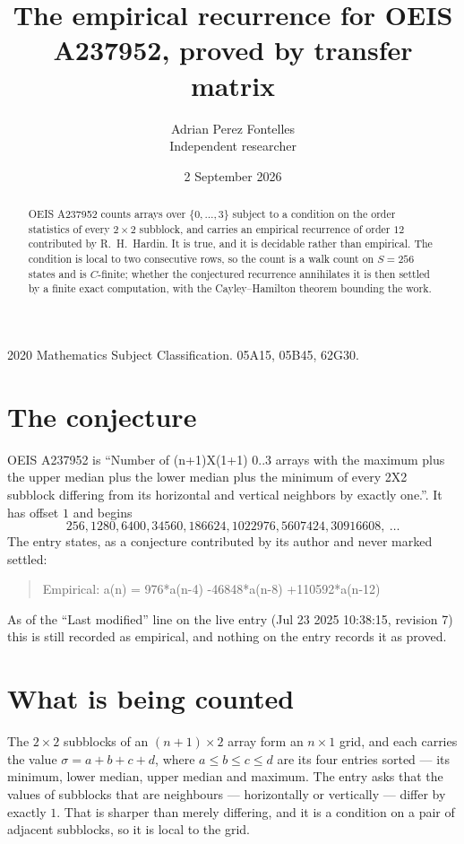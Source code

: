 \documentclass[11pt,a4paper]{article}
\title{The empirical recurrence for OEIS A237952, proved by transfer matrix}
\author{Adrian Perez Fontelles\\ \small Independent researcher}
\date{2 September 2026}
\theoremstyle{plain}
\theoremstyle{definition}
\begin{document}
\maketitle

\begin{abstract}
OEIS A237952 counts arrays over $\{0,\dots,3\}$ subject to a condition on the order
statistics of every $2\times2$ subblock, and carries an empirical recurrence of order
$12$ contributed by R.~H.~Hardin. It is true, and it is decidable rather than empirical.
The condition is local to two consecutive rows, so the count is a walk count on $S=256$
states and is $C$-finite; whether the conjectured recurrence annihilates it is then settled by
a finite exact computation, with the Cayley--Hamilton theorem bounding the work.
\end{abstract}

\noindent\small 2020 Mathematics Subject Classification. 05A15, 05B45, 62G30.\normalsize

\section{The conjecture}

OEIS A237952 is ``Number of (n+1)X(1+1) 0..3 arrays with the maximum plus the upper median plus the lower median plus the minimum of every 2X2 subblock differing from its horizontal and vertical neighbors by exactly one.''. It has offset $1$ and begins
\[
256, 1280, 6400, 34560, 186624, 1022976, 5607424, 30916608,\ \dots
\]
The entry states, as a conjecture contributed by its author and never marked settled:
\begin{quote}
Empirical: a(n) = 976*a(n-4) -46848*a(n-8) +110592*a(n-12)
\end{quote}
As of the ``Last modified'' line on the live entry (Jul 23 2025 10:38:15, revision 7) this is still
recorded as empirical, and nothing on the entry records it as proved.

\section{What is being counted}

The $2\times2$ subblocks of an $(n+1)\times2$ array form an
$n\times1$ grid, and each carries the value $\sigma=a+b+c+d$, where $a\le b\le c\le d$ are its four entries sorted --- its minimum, lower median, upper median and maximum. The entry asks that the values of
subblocks that are neighbours --- horizontally or vertically --- differ by exactly $1$.
That is sharper than merely differing, and it is a condition on a pair of adjacent subblocks,
so it is local to the grid.
\end{document}
